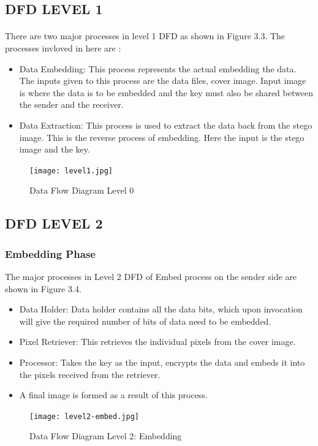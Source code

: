 \documentclass[12pt]{report}
\begin{document}
\subsection{DFD LEVEL 1}
\paragraph{}There are two major processes in level 1 DFD as shown in Figure 3.3. The processes invloved in here are :
\begin{itemize}
\item Data Embedding: This process represents the actual embedding the data. The inputs given to this process are the data files, cover image. Input image is where the data is to be embedded and the key must also be shared between the sender and the receiver.
\item Data Extraction: This process is used to extract the data back from the stego image. This is the reverse process of embedding. Here the input is the stego image and the key.
\end{itemize}
\begin{figure}[h!]
	\centering
		\texttt{[image: level1.jpg]}
		\caption{Data Flow Diagram Level 0}
\end{figure}
\pagebreak
\subsection{DFD LEVEL 2}
\subsubsection{Embedding Phase}
The major processes in Level 2 DFD of Embed process on the sender side are shown in Figure 3.4.
\begin{itemize}
\item Data Holder: Data holder contains all the data bits, which upon invocation will give the required number of bits of data need to be embedded.
\item Pixel Retriever: This retrieves the individual pixels from the cover image. 
\item Processor: Takes the key as the input, encrypts the data and embeds it into the pixels received from the retriever. 
\item A final image is formed as a result of this process.
\end{itemize}
\begin{figure}[h!]
	\centering
		\texttt{[image: level2-embed.jpg]}
		\caption{Data Flow Diagram Level 2: Embedding}
\end{figure}
\pagebreak
\end{document}
